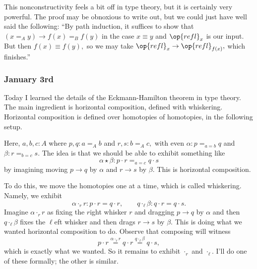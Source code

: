 This nonconstructivity feels a bit off in type theory, but it is certainly very powerful. The proof may be obnoxious to write out, but we could just have well said the following: ``By path induction, it suffices to show that $(x=_Ay)\to f(x)=_Bf(y)$ in the case $x\equiv y$ and $\op{refl}_x$ is our input. But then $f(x)\equiv f(y),$ so we may take $\op{refl}_x\to\op{refl}_{f(x)},$ which finishes.''

\subsubsection{January 3rd}
Today I learned the details of the Eckmann-Hamilton theorem in type theory. The main ingredient is horizontal composition, defined with whiskering. Horizontal composition is defined over homotopies of homotopies, in the following setup.
\begin{center}
\end{center}
Here, $a,b,c:A$ where $p,q:a=_Ab$ and $r,s:b=_Ac,$ with even $\alpha:p=_{a=b}q$ and $\beta:r=_{b=c}s.$ The idea is that we should be able to exhibit something like \[\alpha\star\beta:p\cdot r=_{a=c}q\cdot s\]
by imagining moving $p\to q$ by $\alpha$ and $r\to s$ by $\beta.$ This is horizontal composition.

To do this, we move the homotopies one at a time, which is called whiskering. Namely, we exhibit
\[\alpha\cdot_{r}r:p\cdot r=q\cdot r,\qquad q\cdot_{\ell}\beta:q\cdot r=q\cdot s.\]
Imagine $\alpha\cdot_rr$ as fixing the $r$ight whisker $r$ and dragging $p\to q$ by $\alpha$ and then $q\cdot_\ell\beta$ fixes the $\ell$eft whisker and then drags $r\to s$ by $\beta.$ This is doing what we wanted horizontal composition to do. Observe that composing will witness
\[p\cdot r\stackrel{\alpha\cdot_rr}=q\cdot r\stackrel{q\cdot_\ell\beta}=q\cdot s,\]
which is exactly what we wanted. So it remains to exhibit $\cdot_r$ and $\cdot_\ell.$ I'll do one of these formally; the other is similar.

